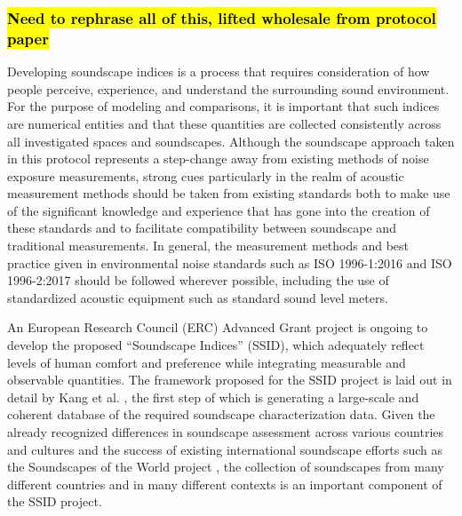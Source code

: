  \subsubsection{\hl{Need to rephrase all of this, lifted wholesale from protocol paper}}

   Developing soundscape indices is a process that requires consideration of how people perceive, experience, and understand the surrounding sound environment. For the purpose of modeling and comparisons, it is important that such indices are numerical entities and that these quantities are collected consistently across all investigated spaces and soundscapes. Although the soundscape approach taken in this protocol represents a step-change away from existing methods of noise exposure measurements, strong cues particularly in the realm of acoustic measurement methods should be taken from existing standards both to make use of the significant knowledge and experience that has gone into the creation of these standards and to facilitate compatibility between soundscape and traditional measurements. In general, the measurement methods and best practice given in environmental noise standards such as ISO 1996-1:2016 and ISO 1996-2:2017 should be followed wherever possible, including the use of standardized acoustic equipment such as standard sound level meters. %

   An European Research Council (ERC) Advanced Grant project is ongoing to develop the proposed ``Soundscape Indices'' (SSID), which adequately reflect levels of human comfort and preference while integrating measurable and observable quantities. The framework proposed for the SSID project is laid out in detail by Kang et al. \citep{Kang2019Towards}, the first step of which is generating a large-scale and coherent database of the required soundscape characterization data. Given the already recognized differences in soundscape assessment across various countries and cultures \citep{Ren2018Soundscape,Kang2016Ten} and the success of existing international soundscape efforts such as the Soundscapes of the World project \citep{DeCoensel2017Urban}, the collection of soundscapes from many different countries and in many different contexts is an important component of the SSID project.

